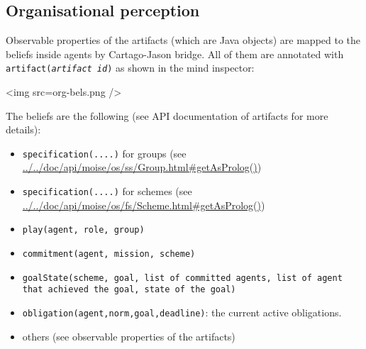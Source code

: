 \documentclass{article}
\newcommand{\code}[1]{\texttt{#1}}
\begin{document}

\subsection*{Organisational perception}

Observable properties of the artifacts (which are Java objects) are
mapped to the beliefs inside agents by Cartago-Jason bridge. All of
them are annotated with \code{artifact(\textit{artifact id})} as shown
in the mind inspector:

\begin{rawhtml}
    <img src=org-bels.png />
\end{rawhtml}

The beliefs are the following (see API documentation of artifacts for more details):
\begin{itemize}
\item \code{specification(....)} for groups (see \url{../../doc/api/moise/os/ss/Group.html#getAsProlog()})
\item \code{specification(....)} for schemes (see \url{../../doc/api/moise/os/fs/Scheme.html#getAsProlog()})
\item \code{play(agent, role, group)}
\item \code{commitment(agent, mission, scheme)}
\item \code{goalState(scheme, goal, list of committed agents, list of agent that achieved the goal, state of the goal)}
\item \code{obligation(agent,norm,goal,deadline)}: the current active obligations.
\item others (see observable properties of the artifacts)
\end{itemize}
\end{document}
